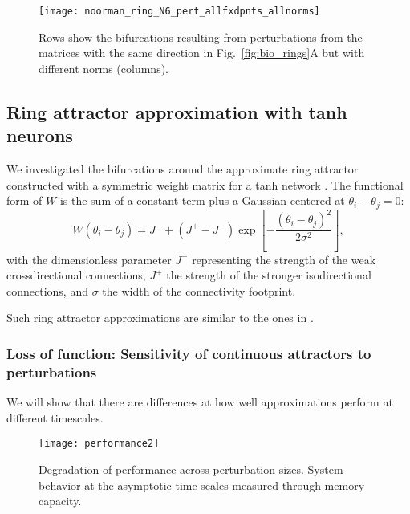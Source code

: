 \documentclass{article} %
\newcounter{ct}
\theoremstyle{definition}
\theoremstyle{remark}
\begin{document}
\begin{figure}[tbhp]
     \centering
    \texttt{[image: noorman\_ring\_N6\_pert\_allfxdpnts\_allnorms]}
       \caption{Rows show the bifurcations resulting from perturbations from the matrices with the same direction in Fig.~\ref{fig:bio_rings}A but with different norms (columns). }
         \label{fig:noorman_ring_allfxdpnts_allnorm}
\end{figure}




\subsection{Ring attractor approximation with tanh neurons}\label{sec:supp:goodridge}


We investigated the bifurcations around the approximate ring attractor constructed with a symmetric weight matrix for a tanh network  \citep{compte2000synaptic, seeholzer2017efficient}.
The functional form of $W$ is the sum of a constant term plus a Gaussian centered at $\theta_i - \theta_j =0$:
\begin{equation}
W(\theta_i - \theta_j) = J^- + (J^+ - J^-) \exp\left[ -\frac{(\theta_i - \theta_j)^2}{2\sigma^2} \right],
\end{equation}
with the dimensionless parameter $J^-$ representing the strength of the weak crossdirectional connections, $J^+$ the strength of the stronger isodirectional connections,
 and $\sigma$ the width of the connectivity footprint.
 
 
 Such ring attractor approximations are similar to the ones in \citep{goodridge2000, samsonovich1997path, redish1996coupled}. %
 



\subsubsection{Loss of function: Sensitivity of continuous attractors to perturbations}\label{sec:supp:boa}

We will show that there are differences at how well approximations perform at different timescales.

\begin{figure}[tbhp]
  \centering
  \texttt{[image: performance2]}
  \caption{Degradation of performance across perturbation sizes. System behavior at the asymptotic time scales measured through memory capacity. }
  \label{fig:performance}
\end{figure}
\end{document}
